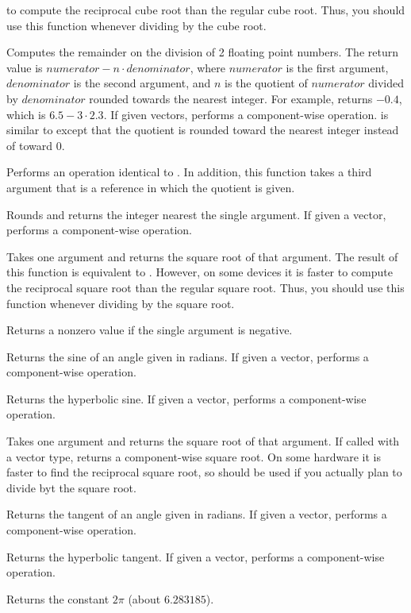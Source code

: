\begin{description}
  to compute the reciprocal cube root than the regular cube root. Thus, you
  should use this function whenever dividing by the cube root.
\item[\vtkm{Remainder}]  Computes the remainder on the
  division of 2 floating point numbers. The return value is $numerator - n
  \cdot denominator$, where $numerator$ is the first argument,
  $denominator$ is the second argument, and $n$ is the quotient of
  $numerator$ divided by $denominator$ rounded towards the nearest
  integer. For example,  returns
  $-0.4$, which is $6.5 - 3\cdot2.3$. If given vectors,
   performs a component-wise
  operation.  is similar to 
  except that the quotient is rounded toward the nearest integer instead of
  toward 0.
\item[\vtkm{RemainderQuotient}] Performs an operation identical to
  . In addition, this function takes a third
  argument that is a reference in which the quotient is given.
\item[\vtkm{Round}] Rounds and returns the integer nearest the single
  argument. If given a vector, performs a component-wise operation.
\item[\vtkm{RSqrt}]  Takes one argument
  and returns the square root of that argument. The result of this function
  is equivalent to . However, on some devices it is
  faster to compute the reciprocal square root than the regular square
  root. Thus, you should use this function whenever dividing by the square
  root.
\item[\vtkm{SignBit}] Returns a nonzero value if the single argument is
  negative.
\item[\vtkm{Sin}]  Returns the sine of an angle given in
  radians. If given a vector, performs a component-wise operation.
\item[\vtkm{SinH}]  Returns the hyperbolic
  sine. If given a vector, performs a component-wise operation.
\item[\vtkm{Sqrt}]  Takes one argument and returns
  the square root of that argument. If called with a vector type, returns a
  component-wise square root. On some hardware it is faster to find the
  reciprocal square root, so  should be used if you
  actually plan to divide byt the square root.
\item[\vtkm{Tan}]  Returns the tangent of an angle given
  in radians. If given a vector, performs a component-wise operation.
\item[\vtkm{TanH}]  Returns the hyperbolic
  tangent. If given a vector, performs a component-wise operation.
\item[\vtkm{TwoPi}] \index{$\pi$} Returns the constant $2\pi$ (about
  $6.283185$).
\end{description}


